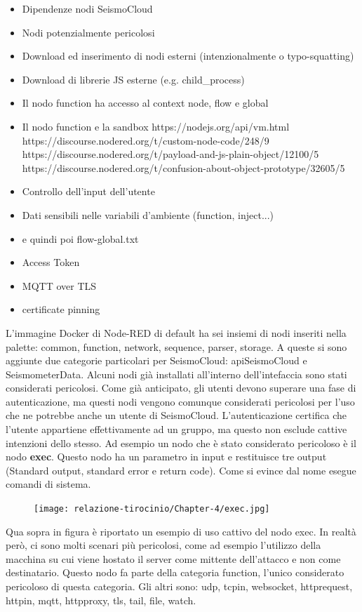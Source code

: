 \documentclass[a4paper,10pt]{memoir}
\begin{document}
\begin{itemize}
    \item Dipendenze nodi SeismoCloud
    \item Nodi potenzialmente pericolosi
    \item Download ed inserimento di nodi esterni (intenzionalmente o typo-squatting)
    \item Download di librerie JS esterne (e.g. child\_process)
    \item Il nodo function ha accesso al context node, flow e global
    \item Il nodo function e la sandbox https://nodejs.org/api/vm.html
    https://discourse.nodered.org/t/custom-node-code/248/9
    https://discourse.nodered.org/t/payload-and-js-plain-object/12100/5
    https://discourse.nodered.org/t/confusion-about-object-prototype/32605/5
    \item Controllo dell'input dell'utente
    \item Dati sensibili nelle variabili d'ambiente (function, inject...)
    \item e quindi poi flow-global.txt
    \item Access Token
    \item MQTT over TLS
    \item certificate pinning
\end{itemize}

L'immagine Docker di Node-RED di default ha sei insiemi di nodi inseriti nella palette: common, function, network, sequence, parser, storage.
A queste si sono aggiunte due categorie particolari per SeismoCloud: apiSeismoCloud e SeismometerData.
Alcuni nodi già installati all'interno dell'intefaccia sono stati considerati pericolosi.
Come già anticipato, gli utenti devono superare una fase di autenticazione, ma questi nodi vengono comunque considerati pericolosi per l'uso che ne potrebbe anche un utente di SeismoCloud. L'autenticazione certifica che l'utente appartiene effettivamente ad un gruppo, ma questo non esclude cattive intenzioni dello stesso.
Ad esempio un nodo che è stato considerato pericoloso è il nodo \textbf{exec}. Questo nodo ha un parametro in input e restituisce tre output (Standard output, standard error e return code). Come si evince dal nome esegue comandi di sistema. 
\begin{figure}[ht]
    \texttt{[image: relazione-tirocinio/Chapter-4/exec.jpg]}
    \label{fig:exec}
\end{figure}
Qua sopra in figura è riportato un esempio di uso cattivo del nodo exec. In realtà però, ci sono molti scenari più pericolosi, come ad esempio l'utilizzo della macchina su cui viene hostato il server come mittente dell'attacco e non come destinatario.
Questo nodo fa parte della categoria function, l'unico considerato pericoloso di questa categoria.
Gli altri sono: udp, tcpin, websocket, httprequest, httpin,
mqtt, httpproxy, tls, tail, file,
watch.
\end{document}
